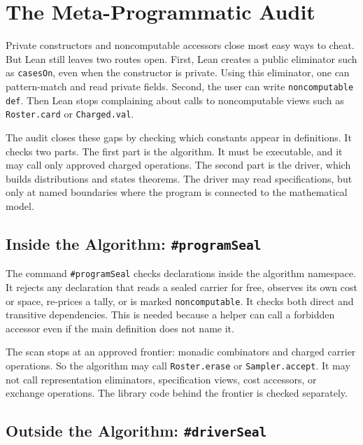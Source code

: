 \documentclass[acmsmall,nonacm]{acmart}
\begin{document}
\section{The Meta-Programmatic Audit}\label{sec:audit}

Private constructors and noncomputable accessors close most easy ways to cheat.
But Lean still leaves two routes open.
First, Lean creates a public eliminator such as \lstinline{casesOn}, even when the constructor is private.
Using this eliminator, one can pattern-match and read private fields.
Second, the user can write \lstinline{noncomputable def}.
Then Lean stops complaining about calls to noncomputable views such as \lstinline{Roster.card} or \lstinline{Charged.val}.

The audit closes these gaps by checking which constants appear in definitions.
It checks two parts.
The first part is the algorithm.
It must be executable, and it may call only approved charged operations.
The second part is the driver, which builds distributions and states theorems.
The driver may read specifications, but only at named boundaries where the program is connected to the mathematical model.

\subsection{Inside the Algorithm: \texttt{\#programSeal}}\label{sec:programseal}

The command \lstinline{#programSeal} checks declarations inside the algorithm namespace.
It rejects any declaration that reads a sealed carrier for free, observes its own cost or space, re-prices a tally, or is marked \lstinline{noncomputable}.
It checks both direct and transitive dependencies.
This is needed because a helper can call a forbidden accessor even if the main definition does not name it.

The scan stops at an approved frontier: monadic combinators and charged carrier operations.
So the algorithm may call \lstinline{Roster.erase} or \lstinline{Sampler.accept}.
It may not call representation eliminators, specification views, cost accessors, or exchange operations.
The library code behind the frontier is checked separately.

\subsection{Outside the Algorithm: \texttt{\#driverSeal}}\label{sec:driverseal}
\end{document}
